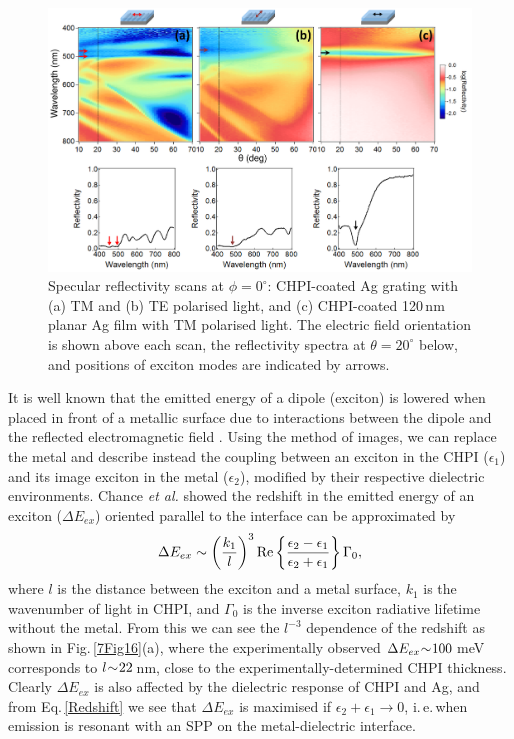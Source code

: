 \begin{figure}[h!] 
\centering    
\includegraphics[width=\textwidth]{Fig15}
\caption{Specular reflectivity scans at $\phi=0^{\circ}$: CHPI-coated Ag grating with (a) TM and (b) TE polarised light, and (c) CHPI-coated 120\,nm planar Ag film with TM polarised light. The electric field orientation is shown above each scan, the reflectivity spectra at $\theta=20^{\circ}$ below, and positions of exciton modes are indicated by arrows.}
\label{7Fig15}
\end{figure}

It is well known that the emitted energy of a dipole (exciton) is lowered when placed in front of a metallic surface due to interactions between the dipole and the reflected electromagnetic field \cite{Morawitz1969, Morawitz1974, Chance1974, Chance1975, Chance1975a, Ford1984}. Using the method of images, we can replace the metal and describe instead the coupling between an exciton in the CHPI ($\epsilon_1$) and its image exciton in the metal ($\epsilon_2$), modified by their respective dielectric environments. Chance \textit{et al.} \cite{Chance1975} showed the redshift in the emitted energy of an exciton ($\Delta E_{ex}$) oriented parallel to the interface can be approximated by
\begin{equation}
\centering
\Delta E_{ex} \sim \left( \frac{k_1}{l} \right) ^3 \text{Re} \left\{ \frac{\epsilon_2 - \epsilon_1}{\epsilon_2 + \epsilon_1} \right\} \Gamma_0 ,
\label{Redshift}
\end{equation}
where $l$ is the distance between the exciton and a metal surface, $k_1$ is the wavenumber of light in CHPI, and $\Gamma_0$ is the inverse exciton radiative lifetime without the metal. From this we can see the $l^{-3}$ dependence of the redshift as shown in Fig.\,\ref{7Fig16}(a), where the experimentally observed $\Delta E_{ex} \negmedspace \sim \negmedspace 100$\,meV corresponds to $l \negmedspace \sim \negmedspace 22$\,nm, close to the experimentally-determined CHPI thickness. Clearly $\Delta E_{ex}$ is also affected by the dielectric response of CHPI and Ag, and from Eq.\,\ref{Redshift} we see that $\Delta E_{ex}$ is maximised if $\epsilon_2 + \epsilon_1 \rightarrow 0$, i.\,e.\,when emission is resonant with an SPP on the metal-dielectric interface. 

